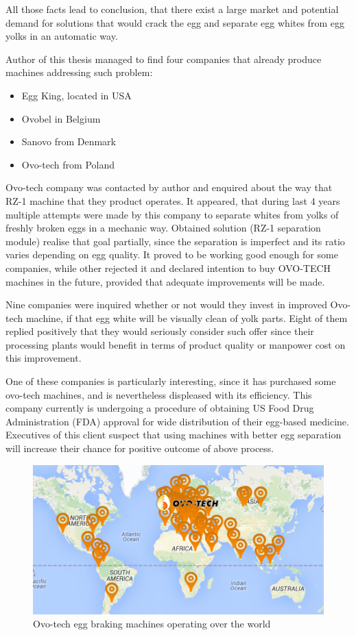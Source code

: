 \documentclass[12pt,twoside,a4paper]{article}
\begin{document}
All those facts lead to conclusion, that there exist a large market and potential demand for solutions that would crack the egg and separate egg whites from egg yolks in an automatic way.

Author of this thesis managed to find four companies that already produce machines addressing such problem:
\begin{itemize}
\item Egg King, located in USA
\item Ovobel in Belgium
\item Sanovo from Denmark
\item Ovo-tech from Poland
\end{itemize}
Ovo-tech company was contacted by author and enquired about the way that RZ-1 machine that they product operates. 
It appeared, that during last 4 years multiple attempts were made by this company to separate whites from yolks of freshly broken eggs in a mechanic way.
Obtained solution (RZ-1 separation module) realise that goal partially, since the separation is imperfect and its ratio varies depending on egg quality.
It proved to be working good enough for some companies, while other rejected it and declared intention to buy OVO-TECH machines in the future, provided that adequate improvements will be made.

Nine companies were inquired whether or not would they invest in improved Ovo-tech machine, if that egg white will be visually clean of yolk parts.
Eight of them replied positively that they would seriously consider such offer since their processing plants would benefit in terms of product quality or manpower cost on this improvement.

One of these companies is particularly interesting, since it has purchased some ovo-tech machines, and is nevertheless displeased with its efficiency.
This company currently is undergoing a procedure of obtaining US Food Drug Administration (FDA) approval for wide distribution of their egg-based medicine.
Executives of this client suspect that using machines with better egg separation will increase their chance for positive outcome of above process.

\begin{figure}[H]
\centering
\includegraphics[width=0.4\paperwidth]{map}
\caption{Ovo-tech egg braking machines operating over the world}
\end{figure}
\end{document}
